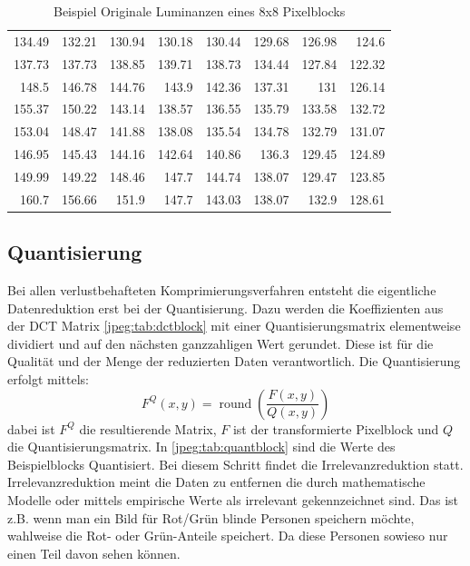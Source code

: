 \begin{table}[b]
    \centering
    \begin{tabular}{*{8}{r}}
        134.49 & 132.21 & 130.94 & 130.18 & 130.44 & 129.68 & 126.98 & 124.6\phantom{0}  \\
        137.73 & 137.73 & 138.85 & 139.71 & 138.73 & 134.44 & 127.84 & 122.32 \\
        148.5\phantom{0}  & 146.78 & 144.76 & 143.9\phantom{0}  & 142.36 & 137.31 & 131\phantom{.00}    & 126.14 \\
        155.37 & 150.22 & 143.14 & 138.57 & 136.55 & 135.79 & 133.58 & 132.72 \\
        153.04 & 148.47 & 141.88 & 138.08 & 135.54 & 134.78 & 132.79 & 131.07 \\
        146.95 & 145.43 & 144.16 & 142.64 & 140.86 & 136.3\phantom{0}  & 129.45 & 124.89 \\
        149.99 & 149.22 & 148.46 & 147.7\phantom{0}  & 144.74 & 138.07 & 129.47 & 123.85 \\
        160.7\phantom{0}  & 156.66 & 151.9\phantom{0}  & 147.7\phantom{0}  & 143.03 & 138.07 & 132.9\phantom{0}  & 128.61
    \end{tabular}
    \caption{Beispiel Originale Luminanzen eines 8x8 Pixelblocks
        \label{jpeg:tab:orgblock}}
\end{table}

\subsection{Quantisierung
\label{jpeg:subsection:quantisierung}}
Bei allen verlustbehafteten Komprimierungsverfahren entsteht die eigentliche Datenreduktion erst bei der Quantisierung.
Dazu werden die Koeffizienten aus der DCT Matrix \ref{jpeg:tab:dctblock} mit einer Quantisierungsmatrix elementweise dividiert und auf den nächsten ganzzahligen Wert gerundet.
Diese ist für die Qualität und der Menge der reduzierten Daten verantwortlich.
Die Quantisierung erfolgt mittels: 
\begin{equation}
    F^Q(x,y)
    =
    \operatorname{round} \left(
    \frac{F(x,y)}{Q(x,y)}
    \right)
\end{equation}
dabei ist \(F^Q\) die resultierende Matrix, \(F\) ist der transformierte Pixelblock und \(Q\) die Quantisierungsmatrix.
In \ref{jpeg:tab:quantblock} sind die Werte des Beispielblocks Quantisiert.
Bei diesem Schritt findet die Irrelevanzreduktion statt.
Irrelevanzreduktion meint die Daten zu entfernen die durch mathematische Modelle oder mittels empirische Werte als irrelevant gekennzeichnet sind.
Das ist z.B. wenn man ein Bild für Rot/Grün blinde Personen speichern möchte, wahlweise die Rot- oder Grün-Anteile speichert.
Da diese Personen sowieso nur einen Teil davon sehen können.

